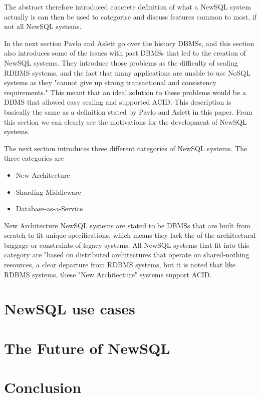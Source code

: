 \documentclass[10pt, conference]{IEEEtran}
\begin{document}
The abstract therefore introduced concrete definition of what a NewSQL system actually is can then be used to categorise and discuss features common to most, if not all NewSQL systems.

In the next section Pavlo and Aslett go over the history DBMSs, and this section also introduces some of the issues with past DBMSs that led to the creation of NewSQL systems. They introduce those problems as the difficulty of scaling RDBMS systems, and the fact that many applications are unable to use NoSQL systems as they "cannot give up strong transactional and consistency requirements." This meant that an ideal solution to these problems would be a DBMS that allowed easy scaling and supported ACID. This description is basically the same as a definition stated by Pavlo and Aslett in this paper. From this section we can clearly see the motivations for the development of NewSQL systems.

The next section introduces three different categories of NewSQL systems. The three categories are

\begin{itemize}
	\item{New Architecture}
	\item{Sharding Middleware}
	\item{Database-as-a-Service}
\end{itemize}

New Architecture NewSQL systems are stated to be DBMSs that are built from scratch to fit unique specifications, which means they lack the of the architectural baggage or constraints of legacy systems. All NewSQL systems that fit into this category are "based on distributed architectures that operate on shared-nothing resources, a clear departure from RDBMS systems, but it is noted that like RDBMS systems, these "New Architecture" systems support ACID.

\section{NewSQL use cases}

\section{The Future of NewSQL}

\section{Conclusion}



\nocite{*}

\end{document}
